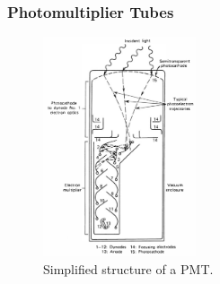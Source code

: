 \subsubsection{Photomultiplier Tubes}
\begin{figure}[ht]
    \centering
    \includegraphics[width=0.4\textwidth]{images/PMT_config.png}
    \caption{Simplified structure of a PMT.}
    \label{fig:PMT_config}
\end{figure}
